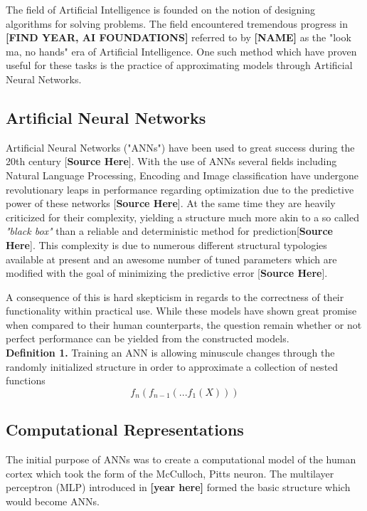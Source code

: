 The field of Artificial Intelligence is founded on the notion of designing algorithms for solving problems. The field encountered tremendous progress in \textbf{[FIND YEAR, AI FOUNDATIONS]} referred to by \textbf{[NAME]} as the "look ma, no hands" era of Artificial Intelligence. One such method which have proven useful for these tasks is the practice of approximating models through Artificial Neural Networks.

\subsection{Artificial Neural Networks}
Artificial Neural Networks ("ANNs") have been used to great success during the 20th century [\textbf{Source Here}]. With the use of ANNs
several fields including Natural Language Processing, Encoding and Image classification have undergone revolutionary leaps in performance regarding optimization due to the predictive power of these networks [\textbf{Source Here}]. At the same time they are heavily criticized for their complexity, yielding a structure much more akin to a so called \textit{"black box"} than a reliable and deterministic method for prediction[\textbf{Source Here}]. This complexity is due to numerous different structural typologies available at present and an awesome number of tuned parameters which are modified with the goal of minimizing the predictive error [\textbf{Source Here}].

A consequence of this is hard skepticism in regards to the correctness of their functionality within practical use. While these models have shown great promise when compared to their human counterparts, the question remain whether or not perfect performance can be yielded from the constructed models.\\

\textbf{Definition 1.} Training an ANN is allowing minuscule changes through the randomly initialized structure in order to approximate a collection of nested functions $$f_n(f_{n-1}(...f_1(X)))$$ 

\subsection{Computational Representations}
The initial purpose of ANNs was to create a computational model of the human cortex which took the form of the McCulloch, Pitts neuron. The multilayer perceptron (MLP) introduced in \textbf{[year here]} formed the basic structure which would become ANNs. 



